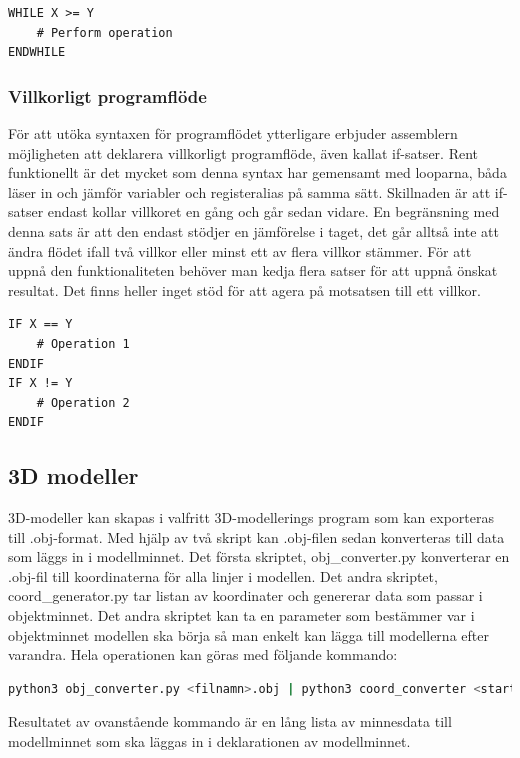 \documentclass[a4paper]{article}
\begin{document}
    \begin{lstlisting}
WHILE X >= Y
    # Perform operation
ENDWHILE
    \end{lstlisting}

    \subsubsection{Villkorligt programflöde}
    För att utöka syntaxen för programflödet ytterligare erbjuder assemblern möjligheten att
    deklarera villkorligt programflöde, även kallat if-satser. Rent funktionellt är det mycket som
    denna syntax har gemensamt med looparna, båda läser in och jämför variabler och registeralias på
    samma sätt. Skillnaden är att if-satser endast kollar villkoret en gång och går sedan vidare.
    En begränsning med denna sats är att den endast stödjer en jämförelse i taget, det går alltså
    inte att ändra flödet ifall två villkor eller minst ett av flera villkor stämmer. För att uppnå
    den funktionaliteten behöver man kedja flera satser för att uppnå önskat resultat. Det finns
    heller inget stöd för att agera på motsatsen till ett villkor.

    \begin{lstlisting}
IF X == Y
    # Operation 1
ENDIF
IF X != Y
    # Operation 2
ENDIF
    \end{lstlisting}

    \subsection{3D modeller}
    3D-modeller kan skapas i valfritt 3D-modellerings program som kan exporteras
    till .obj-format. Med hjälp av två skript kan .obj-filen sedan konverteras
    till data som läggs in i modellminnet. Det första skriptet,
    obj\_converter.py
    konverterar en .obj-fil till koordinaterna för alla linjer i modellen. Det
    andra  skriptet, coord\_generator.py tar listan av koordinater och genererar
    data som passar i objektminnet. Det andra skriptet kan ta en parameter
    som bestämmer var i objektminnet modellen ska börja så man enkelt kan
    lägga till modellerna efter varandra. Hela operationen kan göras med
    följande kommando:

    \begin{lstlisting}[language=bash]
        python3 obj_converter.py <filnamn>.obj | python3 coord_converter <start index>
    \end{lstlisting}

    Resultatet av ovanstående kommando är en lång lista av minnesdata till
    modellminnet som ska läggas in i deklarationen av modellminnet.
\end{document}
